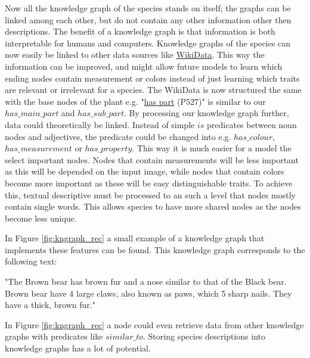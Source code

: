 \documentclass[a4paper, 12pt, oneside]{book} %
\begin{document}
Now all the knowledge graph of the species stands on itself; the graphs can be linked among each other, but do not contain any other information other then descriptions.
The benefit of a knowledge graph is that information is both interpretable for humans and computers.
Knowledge graphs of the species can now easily be linked to other data sources like \href{https://www.wikidata.org/wiki/Wikidata:Main_Page}{WikiData}.
This way the information can be improved, and might allow future models to learn which ending nodes contain measurement or colors instead of just learning which traits are relevant or irrelevant for a species.
The WikiData is now structured the same with the base nodes of the plant e.g. "\href{https://www.wikidata.org/wiki/Property:P527}{has part} (P527)"  is similar to our $has\_main\_part$ and $has\_sub\_part$.
By processing our knowledge graph further, data could theoretically be linked.
Instead of simple $is$ predicates between noun nodes and adjectives, the predicate could be changed into e.g. $has\_colour$, $has\_measurement$ or $has\_property$.
This way it is much easier for a model the select important nodes.
Nodes that contain measurements will be less important as this will be depended on the input image, while nodes that contain colors become more important as these will be easy distinguishable traits.
To achieve this, textual descriptive must be processed to an such a level that nodes mostly contain single words.
This allows species to have more shared nodes as the nodes become less unique.

In Figure \ref{fig:kngraph_rec} a small example of a knowledge graph that implements these features can be found.
This knowledge graph corresponds to the following text:
\newline

\noindent
"The Brown bear has brown fur and a nose similar to that of the Black bear. Brown bear have 4 large claws, also known as paws, which 5 sharp nails. They have a thick, brown fur."
\newline

\noindent
In Figure \ref{fig:kngraph_rec} a node could even retrieve data from other knowledge graphs with predicates like $similar\_to$.
Storing species descriptions into knowledge graphs has a lot of potential.
\end{document}
